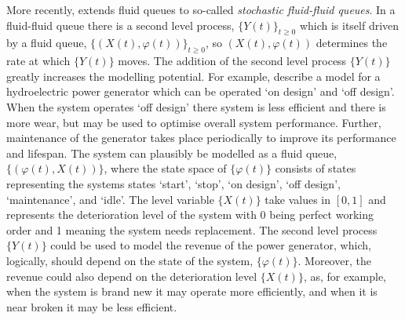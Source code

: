 More recently, \cite{bo2014} extends fluid queues to so-called \emph{stochastic fluid-fluid queues}. In a fluid-fluid queue there is a second level process, \(\{Y(t)\}_{t\geq0}\) which is itself driven by a fluid queue, \(\{(X(t),\varphi(t))\}_{t\geq0}\), so \((X(t),\varphi(t))\) determines the rate at which \(\{Y(t)\}\) moves. The addition of the second level process \(\{Y(t)\}\) greatly increases the modelling potential. For example, \cite{hydro,bo2014} describe a model for a hydroelectric power generator which can be operated `on design' and `off design'. When the system operates `off design' there system is less efficient and there is more wear, but may be used to optimise overall system performance. Further, maintenance of the generator takes place periodically to improve its performance and lifespan. The system can plausibly be modelled as a fluid queue, \(\{(\varphi(t),X(t))\}\), where the state space of \(\{\varphi(t)\}\) consists of states representing the systems states `start', `stop', `on design', `off design', `maintenance', and `idle'. The level variable \(\{X(t)\}\) take values in \([0,1]\) and represents the deterioration level of the system with 0 being perfect working order and 1 meaning the system needs replacement. The second level process \(\{Y(t)\}\) could be used to model the revenue of the power generator, which, logically, should depend on the state of the system, \(\{\varphi(t)\}\). Moreover, the revenue could also depend on the deterioration level \(\{X(t)\}\), as, for example, when the system is brand new it may operate more efficiently, and when it is near broken it may be less efficient. 


